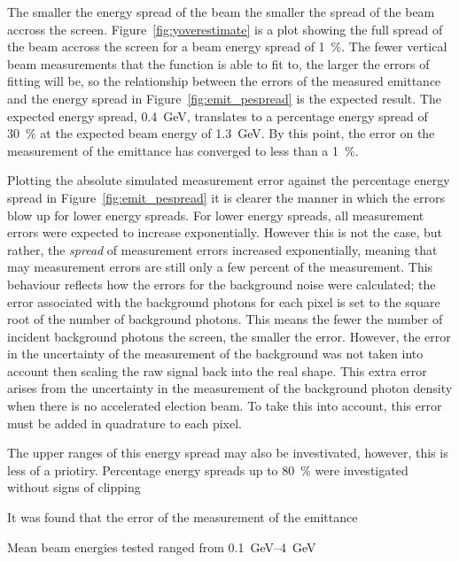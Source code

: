 The smaller the energy spread of the beam the smaller the spread of the beam
accross the screen. Figure~\ref{fig:yoverestimate} is a plot showing the full
spread of the beam accross the screen for a beam energy spread of
\SI{1}{\percent}. The fewer vertical beam measurements that the function is able
to fit to, the larger the errors of fitting will be, so the relationship between
the errors of the measured emittance and the energy spread in
Figure~\ref{fig:emit_pespread} is the expected result. The expected energy
spread, \SI{0.4}{\giga\electronvolt}, translates to a percentage energy spread
of \SI{30}{\percent} at the expected beam energy of
\SI{1.3}{\giga\electronvolt}. By this point, the error on the measurement of the
emittance has converged to less than a \SI{1}{\percent}.

Plotting the absolute simulated measurement error against the percentage energy
spread in Figure~\ref{fig:emit_pespread} it is clearer the manner in which the
errors blow up for lower energy spreads. 
For lower energy spreads, all measurement errors were expected to increase
exponentially.  However this is not the case, but rather, the \emph{spread} of
measurement errors increased exponentially, meaning that may measurement errors
are still only a few percent of the measurement. This behaviour reflects how the
errors for the background noise were calculated; the error associated with the
background photons for each pixel is set to the square root of the number of
background photons. This means the fewer the number of incident background
photons the screen, the smaller the error. However, the error in the uncertainty
of the measurement of the background was not taken into account then scaling the
raw signal back into the real shape. This extra error arises from the
uncertainty in the measurement of the background photon density when there is no
accelerated election beam. To take this into account, this error must be added
in quadrature to each pixel.

The upper ranges of this energy spread may also be investivated, however, this
is less of a priotiry. Percentage energy spreads up to \SI{80}{\percent} were
investigated without signs of clipping



It was found that the error of the measurement of the emittance 

Mean beam energies tested ranged from \SIrange{0.1}{4}{\giga\electronvolt}

